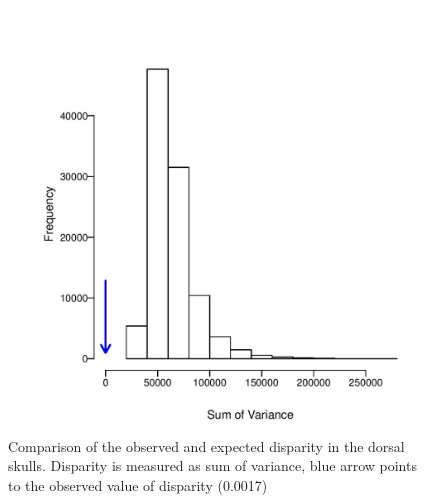 \documentclass[12pt,a4paper]{article}
\begin{document}
\begin{figure}
\centering
\includegraphics[width=1\linewidth]{figures/skdors_trc+gmole_tenrec_sumvariance.jpg}

\caption{Comparison of the observed and expected disparity in the dorsal skulls. Disparity is measured as sum of variance, blue arrow points to the observed value of disparity (0.0017)}
\label{fig:skdors_sumvar}
\end{figure}
\end{document}

